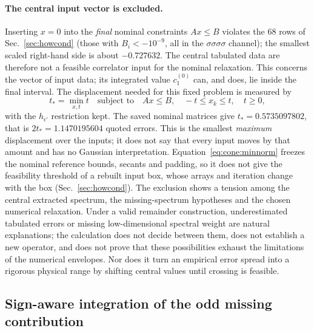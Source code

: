 \documentclass[11pt,a4paper]{article}
\numberwithin{equation}{section}
\begin{document}
\paragraph{The central input vector is excluded.} Inserting $x=0$ into the \emph{final} nominal constraints $Ax\le B$
violates the 68 rows of Sec.~\ref{sec:howcond} (those with $B_i<-10^{-9}$, all in the $\sigma\sigma\sigma\sigma$
channel); the smallest scaled right-hand side is about $-0.727632$. The central tabulated data are therefore not a
feasible correlator input for the nominal relaxation. This concerns the vector of input data; its integrated value
$c_1^{(0)}$ can, and does, lie inside the final interval. The displacement needed for this fixed problem is measured by
\begin{equation}
 t_*=\min_{x,t}t\quad\text{subject to}\quad Ax\le B,\quad -t\le x_k\le t,\quad t\ge0,
 \label{eq:cone:minnorm}
\end{equation}
with the $h_{\epsilon'}$ restriction kept. The saved nominal matrices give $t_*=0.5735097802$, that is
$2t_*=1.1470195604$ quoted errors. This is the smallest \emph{maximum} displacement over the inputs; it does not say
that every input moves by that amount and has no Gaussian interpretation. Equation~\eqref{eq:cone:minnorm} freezes the
nominal reference bounds, secants and padding, so it does not give the feasibility threshold of a rebuilt input box,
whose arrays and iteration change with the box (Sec.~\ref{sec:howcond}). The exclusion shows a tension among the central
extracted spectrum, the missing-spectrum hypotheses and the chosen numerical relaxation. Under a valid remainder
construction, underestimated tabulated errors or missing low-dimensional spectral weight are natural explanations; the
calculation does not decide between them, does not establish a new operator, and does not prove that these
possibilities exhaust the limitations of the numerical envelopes. Nor does it turn an empirical error spread into a
rigorous physical range by shifting central values until crossing is feasible.

\subsection{Sign-aware integration of the odd missing contribution}\label{app:cone:sign}
\end{document}
